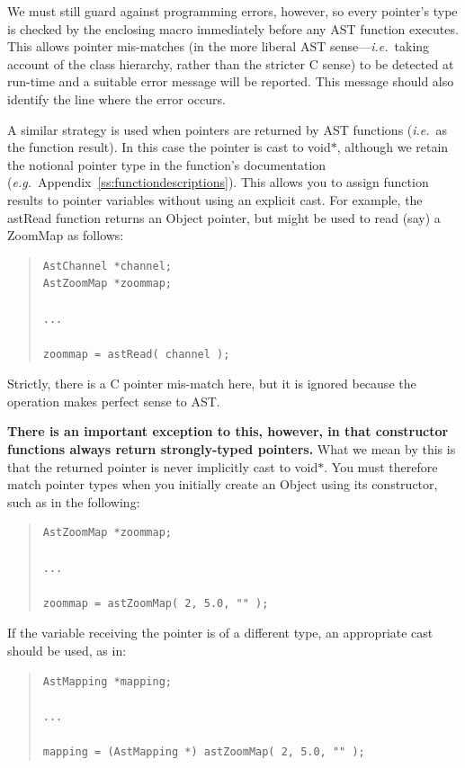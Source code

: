\documentclass[twoside,11pt]{article}
\newcommand{\appref}[1]{Appendix~\ref{#1}}
\newcommand{\appref}[1]{\ref{#1}}
\begin{document}
We must still guard against programming errors, however, so every
pointer's type is checked by the enclosing macro immediately before
any AST function executes. This allows pointer mis-matches (in the
more liberal AST sense---{\em{i.e.}}\ taking account of the class
hierarchy, rather than the stricter C sense) to be detected at
run-time and a suitable error message will be reported. This message
should also identify the line where the error occurs.

A similar strategy is used when pointers are returned by AST functions
({\em{i.e.}}\ as the function result). In this case the pointer is
cast to void$*$, although we retain the notional pointer type in the
function's documentation
({\em{e.g.}}\ \appref{ss:functiondescriptions}). This allows you to
assign function results to pointer variables without using an explicit
cast. For example, the astRead function returns an Object pointer, but
might be used to read (say) a ZoomMap as follows:

\begin{quote}
\small
\begin{verbatim}
AstChannel *channel;
AstZoomMap *zoommap;

...

zoommap = astRead( channel );
\end{verbatim}
\normalsize
\end{quote}

Strictly, there is a C pointer mis-match here, but it is ignored
because the operation makes perfect sense to AST.

{\bf{There is an important exception to this, however, in that
constructor functions always return strongly-typed pointers.}}  What
we mean by this is that the returned pointer is never implicitly cast
to void$*$. You must therefore match pointer types when you initially
create an Object using its constructor, such as in the following:

\begin{quote}
\small
\begin{verbatim}
AstZoomMap *zoommap;

...

zoommap = astZoomMap( 2, 5.0, "" );
\end{verbatim}
\normalsize
\end{quote}

If the variable receiving the pointer is of a different type, an
appropriate cast should be used, as in:

\begin{quote}
\small
\begin{verbatim}
AstMapping *mapping;

...

mapping = (AstMapping *) astZoomMap( 2, 5.0, "" );
\end{verbatim}
\normalsize
\end{quote}
\end{document}
